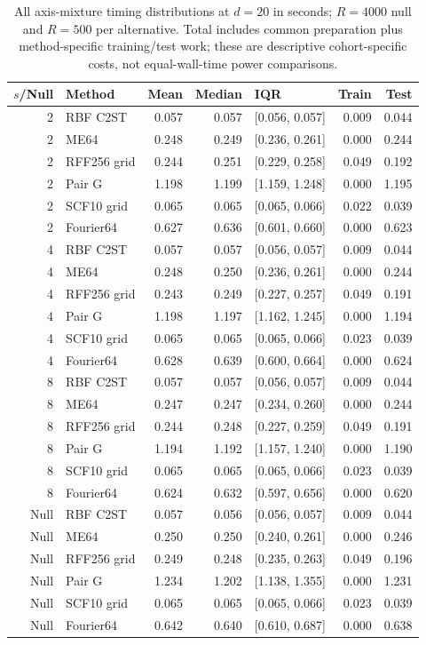 \begin{table}[t]\centering\scriptsize
\caption{All axis-mixture timing distributions at $d=20$ in seconds; $R=4000$ null and $R=500$ per alternative. Total includes common preparation plus method-specific training/test work; these are descriptive cohort-specific costs, not equal-wall-time power comparisons.}
\label{tab:axis-runtime-d20}
{\setlength{\tabcolsep}{8pt}\renewcommand{\arraystretch}{1.2}
\begin{tabular}{rlrrlrr}
\toprule
$s$/Null & Method & Mean & Median & IQR & Train & Test\\
\midrule
2 & RBF C2ST & 0.057 & 0.057 & [0.056, 0.057] & 0.009 & 0.044\\
2 & ME64 & 0.248 & 0.249 & [0.236, 0.261] & 0.000 & 0.244\\
2 & RFF256 grid & 0.244 & 0.251 & [0.229, 0.258] & 0.049 & 0.192\\
2 & Pair G & 1.198 & 1.199 & [1.159, 1.248] & 0.000 & 1.195\\
2 & SCF10 grid & 0.065 & 0.065 & [0.065, 0.066] & 0.022 & 0.039\\
2 & Fourier64 & 0.627 & 0.636 & [0.601, 0.660] & 0.000 & 0.623\\
4 & RBF C2ST & 0.057 & 0.057 & [0.056, 0.057] & 0.009 & 0.044\\
4 & ME64 & 0.248 & 0.250 & [0.236, 0.261] & 0.000 & 0.244\\
4 & RFF256 grid & 0.243 & 0.249 & [0.227, 0.257] & 0.049 & 0.191\\
4 & Pair G & 1.198 & 1.197 & [1.162, 1.245] & 0.000 & 1.194\\
4 & SCF10 grid & 0.065 & 0.065 & [0.065, 0.066] & 0.023 & 0.039\\
4 & Fourier64 & 0.628 & 0.639 & [0.600, 0.664] & 0.000 & 0.624\\
8 & RBF C2ST & 0.057 & 0.057 & [0.056, 0.057] & 0.009 & 0.044\\
8 & ME64 & 0.247 & 0.247 & [0.234, 0.260] & 0.000 & 0.244\\
8 & RFF256 grid & 0.244 & 0.248 & [0.227, 0.259] & 0.049 & 0.191\\
8 & Pair G & 1.194 & 1.192 & [1.157, 1.240] & 0.000 & 1.190\\
8 & SCF10 grid & 0.065 & 0.065 & [0.065, 0.066] & 0.023 & 0.039\\
8 & Fourier64 & 0.624 & 0.632 & [0.597, 0.656] & 0.000 & 0.620\\
Null & RBF C2ST & 0.057 & 0.056 & [0.056, 0.057] & 0.009 & 0.044\\
Null & ME64 & 0.250 & 0.250 & [0.240, 0.261] & 0.000 & 0.246\\
Null & RFF256 grid & 0.249 & 0.248 & [0.235, 0.263] & 0.049 & 0.196\\
Null & Pair G & 1.234 & 1.202 & [1.138, 1.355] & 0.000 & 1.231\\
Null & SCF10 grid & 0.065 & 0.065 & [0.065, 0.066] & 0.023 & 0.039\\
Null & Fourier64 & 0.642 & 0.640 & [0.610, 0.687] & 0.000 & 0.638\\
\bottomrule
\end{tabular}}
\end{table}

